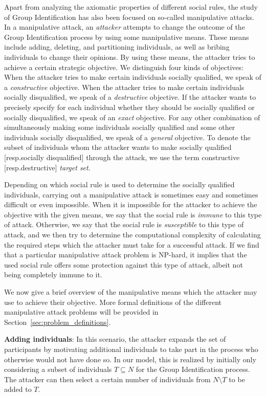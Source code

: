 \documentclass[
    12pt,               %
    a4paper,            %
    bibtotoc,           %
    pointlessnumbers,   %
    ngerman,            %
    titlepage,          %
    leqno,              %
    ]{scrarticle}       %
\newcommand\secref{Section~\ref}
\begin{document}
Apart from analyzing the axiomatic properties of different social rules, the study of Group Identification has also been focused on so-called manipulative attacks. In a manipulative attack, an \emph{attacker} attempts to change the outcome of the Group Identification process by using some manipulative means. These means include adding, deleting, and partitioning individuals, as well as bribing individuals to change their opinions. By using these means, the attacker tries to achieve a certain strategic objective. We distinguish four kinds of objectives: When the attacker tries to make certain individuals socially qualified, we speak of a \emph{constructive} objective. When the attacker tries to make certain individuals socially disqualified, we speak of a \emph{destructive} objective. If the attacker wants to precisely specify for each individual whether they should be socially qualified or socially disqualified, we speak of an \emph{exact} objective. For any other combination of simultaneously making some individuals socially qualified and some other individuals socially disqualified, we speak of a \emph{general} objective. 
To denote the subset of individuals whom the attacker wants to make socially qualified [resp.\@ socially disqualified] through the attack, we use the term constructive [resp.\@ destructive] \emph{target set}.

Depending on which social rule is used to determine the socially qualified individuals, carrying out a manipulative attack is sometimes easy and sometimes difficult or even impossible. When it is impossible for the attacker to achieve the objective with the given means, we say that the social rule is \emph{immune} to this type of attack. Otherwise, we say that the social rule is \emph{susceptible} to this type of attack, and we then try to determine the computational complexity of calculating the required steps which the attacker must take for a successful attack. If we find that a particular manipulative attack problem is NP-hard, it implies that the used social rule offers some protection against this type of attack, albeit not being completely immune to it.

We now give a brief overview of the manipulative means which the attacker may use to achieve their objective. More formal definitions of the different manipulative attack problems will be provided in \secref{sec:problem_definitions}.

\textbf{Adding individuals}: In this scenario, the attacker expands the set of participants by motivating additional individuals to take part in the process who otherwise would not have done so. In our model, this is realized by initially only considering a subset of individuals $T \subseteq N$ for the Group Identification process. The attacker can then select a certain number of individuals from $N \setminus T$ to be added to $T$.
\end{document}
